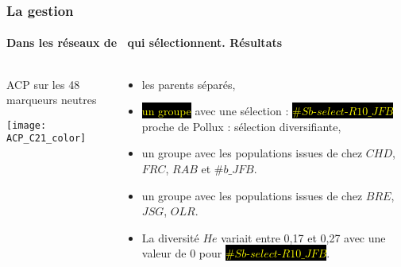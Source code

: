 \begin{frame}
\frametitle{La gestion \insitu}
\framesubtitle{Dans les réseaux de \MSPs~qui sélectionnent. Résultats}

\begin{columns}

\begin{column}{.5\textwidth}

\begin{center}
ACP sur les 48 marqueurs neutres
\end{center}
\texttt{[image: ACP\_C21\_color]}
\end{column}

\begin{column}{.5\textwidth}

\begin{itemize}
\item les  \textcolor{bleu}{parents} \textcolor{vert}{séparés},

\item \colorbox{black}{\textcolor{yellow}{un groupe}} avec une sélection : \colorbox{black}{\textcolor{yellow}{$\#Sb$-$select$-$R10\_JFB$}} proche de Pollux : sélection diversifiante,
\item \textcolor{rose}{un groupe} avec les populations issues de chez \textcolor{rose}{$CHD$}, \textcolor{rose}{$FRC$}, \textcolor{rose}{$RAB$} et \textcolor{rose}{$\#b\_JFB$}. %
\item \textcolor{marron}{un groupe} avec les populations issues de chez \textcolor{marron}{$BRE$}, \textcolor{marron}{$JSG$}, \textcolor{marron}{$OLR$}.
\item La diversité $He$ variait entre 0,17 et 0,27 avec une valeur de 0 pour \colorbox{black}{\textcolor{yellow}{$\#Sb$-$select$-$R10\_JFB$}}.
\end{itemize}

\end{column}

\end{columns}

\end{frame}





